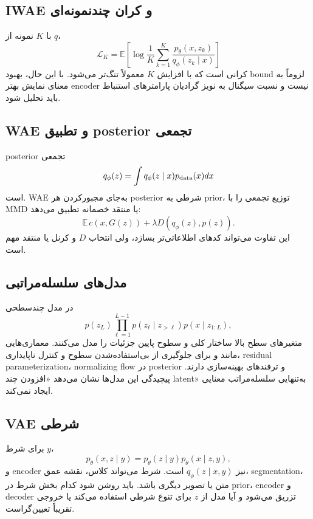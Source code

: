 \documentclass[12pt,openany,oneside]{book}
\newcommand{\E}{\mathbb{E}}
\begin{document}
\subsection{IWAE و کران چندنمونه‌ای}
با $K$ نمونه از $q$،
\begin{equation}
 \mathcal L_K=\E\left[\log\frac1K\sum_{k=1}^K
 \frac{p_\theta(x,z_k)}{q_\phi(z_k\mid x)}\right]
\end{equation}
کرانی است که با افزایش $K$ معمولاً تنگ‌تر می‌شود. با این حال، بهبود bound لزوماً به معنای نمایش بهتر encoder نیست و نسبت سیگنال به نویز گرادیان پارامترهای استنباط باید تحلیل شود.

\subsection{WAE و تطبیق posterior تجمعی}
posterior تجمعی
\begin{equation}
 q_\phi(z)=\int q_\phi(z\mid x)p_{\rm data}(x)dx
\end{equation}
است. WAE به‌جای مجبورکردن هر posterior شرطی به prior، توزیع تجمعی را با MMD یا منتقد خصمانه تطبیق می‌دهد:
\begin{equation}
 \E\,c(x,G(z))+\lambda D(q_\phi(z),p(z)).
\end{equation}
این تفاوت می‌تواند کدهای اطلاعاتی‌تر بسازد، ولی انتخاب $D$ و کرنل یا منتقد مهم است.

\subsection{مدل‌های سلسله‌مراتبی}
در مدل چندسطحی
\begin{equation}
 p(z_L)\prod_{\ell=1}^{L-1}p(z_\ell\mid z_{>\ell})p(x\mid z_{1:L}),
\end{equation}
متغیرهای سطح بالا ساختار کلی و سطوح پایین جزئیات را مدل می‌کنند. معماری‌هایی مانند  و  برای
جلوگیری از بی‌استفاده‌شدن سطوح و کنترل ناپایداری، residual parameterization، normalizing flow در posterior و ترفندهای
بهینه‌سازی دارند. پیچیدگی این مدل‌ها نشان می‌دهد «افزودن چند latent» به‌تنهایی سلسله‌مراتب معنایی ایجاد نمی‌کند.

\subsection{VAE شرطی}
برای شرط $y$،
\begin{equation}
 p_\theta(x,z\mid y)=p_\theta(z\mid y)p_\theta(x\mid z,y),
\end{equation}
و encoder نیز $q_\phi(z\mid x,y)$ است. شرط می‌تواند کلاس، نقشه عمق، segmentation، متن یا تصویر دیگری باشد. باید روشن شود
کدام بخش شرط در prior، encoder و decoder تزریق می‌شود و آیا مدل از $z$ برای تنوع شرطی استفاده می‌کند یا خروجی تقریباً تعیین‌گراست.
\end{document}
